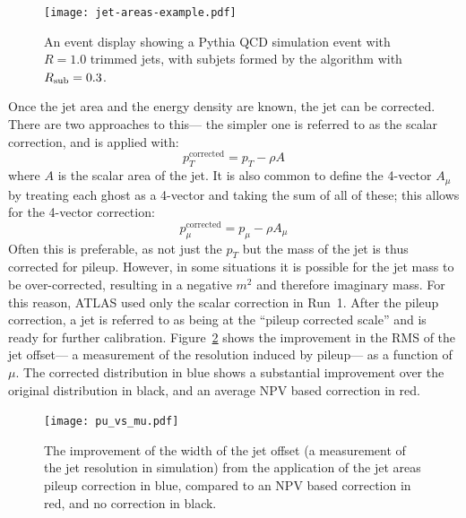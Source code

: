 
\begin{figure}
\centering
\texttt{[image: jet-areas-example.pdf]}
\label{fig:jet-reconstruction:jet-active-areas}
\caption{An event display showing a Pythia QCD simulation event with \antikt $R=1.0$ trimmed jets, with subjets formed by the \kt algorithm with $R_{\rm sub} = 0.3$.}
\end{figure}


Once the jet area and the energy density are known, the jet can be corrected. There are two approaches to this--- the simpler one is referred to as the scalar correction, and is applied with:
%
\begin{equation}
p_T^{\mathrm{corrected}} = p_T - \rho A
\end{equation}
%
where $A$ is the scalar area of the jet. It is also common to define the 4-vector $A_\mu$ by treating each ghost as a 4-vector and taking the sum of all of these; this allows for the 4-vector correction:
%
\begin{equation}
p_\mu^{\mathrm{corrected}} = p_\mu - \rho A_\mu
\end{equation}
%
Often this is preferable, as not just the $p_T$ but the mass of the jet is thus corrected for pileup. However, in some situations it is possible for the jet mass to be over-corrected, resulting in a negative $m^2$ and therefore imaginary mass. For this reason, ATLAS used only the scalar correction in Run~1. After the pileup correction, a jet is referred to as being at the ``pileup corrected scale'' and is ready for further calibration. Figure~\ref{fig:jet-reconstruction:jet-pu-vs-mu} shows the improvement in the RMS of the jet offset--- a measurement of the resolution induced by pileup--- as a function of $\mu$. The corrected distribution in blue shows a substantial improvement over the original distribution in black, and an average NPV based correction in red.


\begin{figure}
\centering
\texttt{[image: pu\_vs\_mu.pdf]}
\label{fig:jet-reconstruction:jet-pu-vs-mu}
\caption{The improvement of the width of the jet offset (a measurement of the jet resolution in simulation) from the application of the jet areas pileup correction in blue, compared to an NPV based correction in red, and no correction in black.}
\end{figure}


